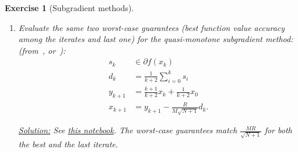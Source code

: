 \documentclass[11pt,a4paper]{article}
\newcommand{\correction}[1]{{{\color{blue}\underline{Solution:} #1}}}
\newcommand{\correction}[1]{}
\newtheorem{exercise}{Exercise}
\begin{document}
\begin{exercise}[Subgradient methods]
\begin{enumerate}
	\item Evaluate the same two worst-case guarantees (best function value accuracy among the iterates and last one) for the quasi-monotone subgradient method: (from~\cite{nesterov2015quasi}, or~\cite{drori2018efficient}):
	\begin{equation*}
	\begin{aligned}
	s_{k}&\in\partial f(x_{k})\\
	d_{k}&=\frac{1}{k+2}\sum_{i=0}^{k}s_i\\
	y_{k+1}&=\frac{k+1}{k+2}x_k+\frac{1}{k+2}x_0\\
	x_{k+1}&=y_{k+1}-\frac{R}{M\sqrt{N+1}}d_k.
	\end{aligned}
	\end{equation*}
	
	\correction{ See \href{https://github.com/PerformanceEstimation/Learning-Performance-Estimation/tree/main/Codes/Jupyter/Exercise08.ipynb}{this notebook}. The worst-case guarantees match $\frac{MR}{\sqrt{N+1}}$ for both the best and the last iterate.}
	\end{enumerate}
	
	\end{exercise}
	
\end{document}

